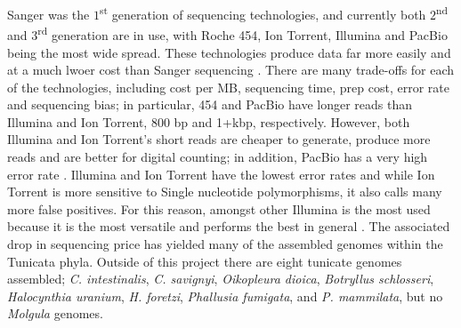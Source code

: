 Sanger was the $1$\textsuperscript{st} generation of sequencing technologies, and currently both $2$\textsuperscript{nd} and $3$\textsuperscript{rd} generation are in use, with Roche 454, Ion Torrent, Illumina and PacBio being the most wide spread. These technologies produce data far more easily and at a much lwoer cost than Sanger sequencing \cite{metzker_emerging_2005}. There are many trade-offs for each of the technologies, including cost per MB, sequencing time, prep cost, error rate and sequencing bias; in particular, 454 and PacBio have longer reads than Illumina and Ion Torrent, 800 bp and 1+kbp, respectively. However, both Illumina and Ion Torrent's short reads are cheaper to generate, produce more reads and are better for digital counting; in addition, PacBio has a very high error rate \cite{glenn_field_2011}. Illumina and Ion Torrent have the lowest error rates and while Ion Torrent is more sensitive to Single nucleotide polymorphisms, it also calls many more false positives.  For this reason, amongst other Illumina is the most used because it is the most versatile and performs the best in general \cite{quail_tale_2012}. The associated drop in sequencing price has yielded many of the assembled genomes within the Tunicata phyla. Outside of this project there are eight tunicate genomes assembled; \textit{C. intestinalis}, \textit{C. savignyi}, \textit{Oikopleura dioica}, \textit{Botryllus schlosseri}, \textit{Halocynthia uranium}, \textit{H. foretzi}, \textit{Phallusia fumigata}, and \textit{P. mammilata}, but no \textit{Molgula} genomes.
